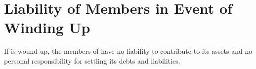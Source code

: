 \section{Liability of Members in Event of Winding Up}\label{sec:liability}
If \shortname{} is wound up, the members of \shortname{} have no liability to contribute to its assets and no personal responsibility for settling its debts and liabilities.
